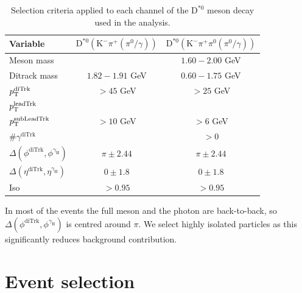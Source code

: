 \begin{table}[!ht]
    \centering
    \begin{tabular}{|l|c|c|}
        \hline
        \cellcolor{lightgray}Variable & \cellcolor{lightgray}$\text{D}^{*0}(\text{K}^{-}\pi^{+}{\scriptstyle(\pi^{0}/\gamma)})$ & \cellcolor{lightgray}$\text{D}^{*0}(\text{K}^{-}\pi^{+}\pi^{0}{\scriptstyle(\pi^{0}/\gamma)})$ \\ \hline
        Meson mass                                              &                   &$1.60-2.00$ GeV  \\
        Ditrack mass                                            &$1.82-1.91$ GeV    &$0.60-1.75$ GeV  \\
        $p_\text{T}^{\text{diTrk}}$                                    &$>45$ GeV          &$>25$ GeV           \\
        $p_\text{T}^{\text{leadTrk}}$                                  &           &           \\
        $p_\text{T}^{\text{subLeadTrk}}$                               &$>10$ GeV          &$>6$ GeV           \\
        $\#\gamma^{\text{diTrk}}$                               &                   &$>0$               \\
        $\Delta(\phi^{\text{diTrk}}, \phi^{\gamma_\text{H}})$   &$\pi\pm2.44$       &$\pi\pm2.44$        \\
        $\Delta(\eta^{\text{diTrk}}, \eta^{\gamma_\text{H}})$   &$0\pm1.8$          &$0\pm1.8$           \\
        Iso                                                     &$>0.95$            &$>0.95$             \\
        \hline
        \end{tabular}
    \caption{Selection criteria applied to each channel of the $\text{D}^{*0}$ meson decay used in the analysis.}
    \label{tab:meson_selection_2}
\end{table}

In most of the events the full meson and the photon are back-to-back, so $\Delta(\phi^{\text{diTrk}}, \phi^{\gamma_\text{H}})$ is centred around $\pi$. We select highly isolated particles as this significantly reduces background contribution.

\section{Event selection}\label{sec:event_selection}

